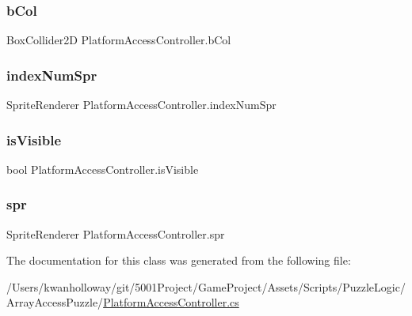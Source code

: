 \subsubsection{\texorpdfstring{b\+Col}{bCol}}
{\footnotesize\ttfamily Box\+Collider2D Platform\+Access\+Controller.\+b\+Col}

\mbox{\label{class_platform_access_controller_a96b290b37dd60e9c78015b86c94ffbe7}} 
\subsubsection{\texorpdfstring{index\+Num\+Spr}{indexNumSpr}}
{\footnotesize\ttfamily Sprite\+Renderer Platform\+Access\+Controller.\+index\+Num\+Spr}

\mbox{\label{class_platform_access_controller_ae61d142d689e9436ffcdd42ae258b74b}} 
\subsubsection{\texorpdfstring{is\+Visible}{isVisible}}
{\footnotesize\ttfamily bool Platform\+Access\+Controller.\+is\+Visible}

\mbox{\label{class_platform_access_controller_a148223f08e156ce2c3cbf9b87feb83d2}} 
\subsubsection{\texorpdfstring{spr}{spr}}
{\footnotesize\ttfamily Sprite\+Renderer Platform\+Access\+Controller.\+spr}



The documentation for this class was generated from the following file\+:\begin{DoxyCompactItemize}
\item 
/\+Users/kwanholloway/git/5001\+Project/\+Game\+Project/\+Assets/\+Scripts/\+Puzzle\+Logic/\+Array\+Access\+Puzzle/\hyperlink{_platform_access_controller_8cs}{Platform\+Access\+Controller.\+cs}\end{DoxyCompactItemize}
